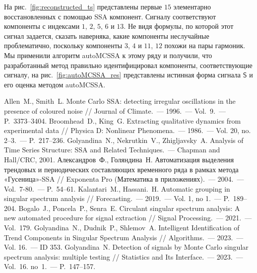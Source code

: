 \documentclass[12pt]{article}
\begin{document}
На рис.~\ref{fig:reconstructed_ts} представлены первые $15$ элементарно восстановленных с помощью SSA компонент. Сигналу соответствуют компоненты с индексами $1$, $2$, $5$, $6$ и $13$. Не видя формулы, по которой этот сигнал задается, сказать наверняка, какие компоненты неслучайные проблематично, поскольку компоненты $3$, $4$ и $11$, $12$ похожи на пары гармоник. Мы применили алгоритм autoMCSSA к этому ряду и получили, что разработанный метод правильно идентифицировал компоненты, соответствующие сигналу, на рис.~\ref{fig:autoMCSSA_res} представлены истинная форма сигнала $\mathsf{S}$ и его оценка методом autoMCSSA.


\begin{thebibliography}{10}

     Allen~M., Smith~L. Monte Carlo SSA: detecting irregular oscillations in the presence of coloured noise // Journal of Climate.~--- 1996.~--- Vol.~9.~--- P.~3373--3404.
     Broomhead~D., King~G. Extracting qualitative dynamics from experimental data // Physica D: Nonlinear Phenomena.~--- 1986.~--- Vol. 20, no. 2–3.~--- P.~217--236.
     Golyandina~N., Nekrutkin~V., Zhigljavsky~A. Analysis of Time Series Structure: SSA and Related Techniques.~--- Chapman and Hall/CRC, 2001.
     Александров~Ф., Голяндина~Н.
    Автоматизация выделения трендовых и периодических составляющих временного ряда в рамках метода «Гусеница»-SSA // Exponenta Pro (Математика в приложениях).~--- 2004.~--- Vol.~7-80.~--- P.~54--61.
     Kalantari~M., Hassani.~H. Automatic grouping in singular spectrum analysis // Forecasting.~--- 2019.~--- Vol. 1, no 1.~--- P.~189--204.
     Bogalo~J., Poncela~P., Senra~E. Circulant singular spectrum analysis: A new automated procedure for signal extraction // Signal Processing.~--- 2021.~--- Vol.~179.
     Golyandina~N., Dudnik~P., Shlemov~A. Intelligent Identification of Trend Components in Singular Spectrum Analysis // Algorithms.~--- 2023.~--- Vol. 16.~--- ID 353.
     Golyandina~N. Detection of signals by Monte Carlo singular spectrum analysis: multiple testing // Statistics and Its Interface.~--- 2023.~--- Vol.~16. no~1.~--- P.~147--157.

\end{thebibliography}
\end{document}
